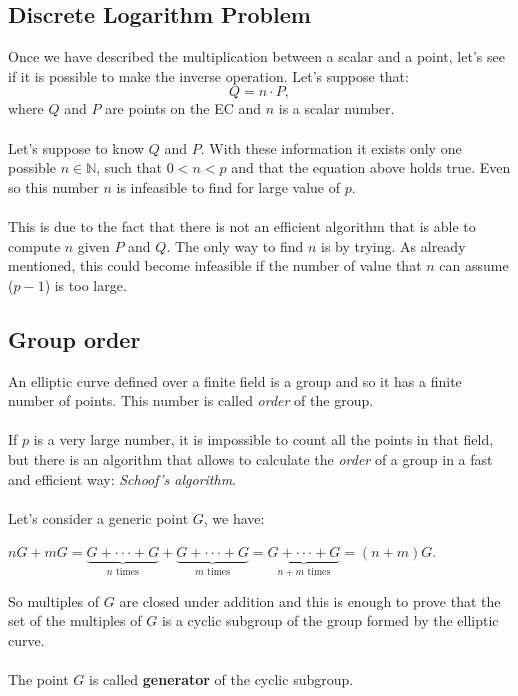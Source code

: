 \subsection{Discrete Logarithm Problem}
Once we have described the multiplication between a scalar and a point, let's see if it is possible to make the inverse operation. Let's suppose that:
\begin{equation*}
Q = n \cdot P,
\end{equation*}
where $Q$ and $P$ are points on the EC and $n$ is a scalar number. 
\\ \\ 
Let's suppose to know $Q$ and $P$. With these information it exists only one possible $n \in \mathbb{N}$, such that $0<n<p$ and that the equation above holds true. Even so this number $n$ is infeasible to find for large value of $p$.
\\ \\
This is due to the fact that there is not an efficient algorithm that is able to compute $n$ given $P$ and $Q$. The only way to find $n$ is by trying. As already mentioned, this could become infeasible if the number of value that $n$ can assume ($p-1$) is too large.

\subsection{Group order}
An elliptic curve defined over a finite field is a group and so it has a finite number of points. This number is called \textit{order} of the group.
\\ \\
If $p$ is a very large number, it is impossible to count all the points in that field, but there is an algorithm that allows to calculate the \textit{order} of a group in a fast and efficient way: \textit{Schoof's algorithm}.
\\ \\
Let's consider a generic point $G$, we have:
\begin{center} 
	$ nG+mG=\underbrace{
		G+\cdot \cdot \cdot+G
	}_{n\text{ times}}+
	\underbrace{
		G+\cdot \cdot \cdot+G
	}_{m\text{ times}}=
	\underbrace{
		G+\cdot \cdot \cdot+G
	}_{n+m\text{ times}} = 
	(n+m)G$.
\end{center}
So multiples of $G$ are closed under addition and this is enough to prove that the set of the multiples of $G$ is a cyclic subgroup of the group formed by the elliptic curve.
\\ \\
The point $G$ is called \textbf{generator} of the cyclic subgroup.

